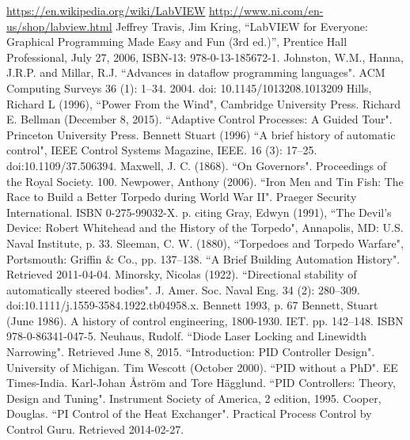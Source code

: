 
\begin{thebibliography}{99}

 \url{https://en.wikipedia.org/wiki/LabVIEW}
 \url{http://www.ni.com/en-us/shop/labview.html}
 Jeffrey Travis, Jim Kring, “LabVIEW for Everyone: Graphical Programming Made Easy and Fun (3rd ed.)”, Prentice Hall Professional, July 27, 2006, ISBN-13: 978-0-13-185672-1.
 Johnston, W.M., Hanna, J.R.P. and Millar, R.J. ``Advances in dataflow programming languages". ACM Computing Surveys 36 (1): 1–34. 2004. doi: 10.1145/1013208.1013209
 Hills, Richard L (1996), ``Power From the Wind", Cambridge University Press.
 Richard E. Bellman (December 8, 2015). ``Adaptive Control Processes: A Guided Tour". Princeton University Press.
 Bennett Stuart (1996) ``A brief history of automatic control", IEEE Control Systems Magazine, IEEE. 16 (3): 17–25. doi:10.1109/37.506394.
 Maxwell, J. C. (1868). ``On Governors". Proceedings of the Royal Society. 100.
 Newpower, Anthony (2006). ``Iron Men and Tin Fish: The Race to Build a Better Torpedo during World War II". Praeger Security International. ISBN 0-275-99032-X. p.  citing Gray, Edwyn (1991), ``The Devil's Device: Robert Whitehead and the History of the Torpedo", Annapolis, MD: U.S. Naval Institute, p. 33.
 Sleeman, C. W. (1880), ``Torpedoes and Torpedo Warfare", Portsmouth: Griffin \& Co., pp. 137–138.
 ``A Brief Building Automation History". Retrieved 2011-04-04.
 Minorsky, Nicolas (1922). ``Directional stability of automatically steered bodies". J. Amer. Soc. Naval Eng. 34 (2): 280–309. doi:10.1111/j.1559-3584.1922.tb04958.x.
 Bennett 1993, p. 67
 Bennett, Stuart (June 1986). A history of control engineering, 1800-1930. IET. pp. 142–148. ISBN 978-0-86341-047-5.
 Neuhaus, Rudolf. ``Diode Laser Locking and Linewidth Narrowing". Retrieved June 8, 2015.
 ``Introduction: PID Controller Design". University of Michigan.
 Tim Wescott (October 2000). ``PID without a PhD". EE Times-India.
 Karl-Johan Åström and Tore Hägglund. ``PID Controllers: Theory, Design and Tuning". Instrument Society of America, 2 edition, 1995.
 Cooper, Douglas. ``PI Control of the Heat Exchanger". Practical Process Control by Control Guru. Retrieved 2014-02-27.

\end{thebibliography}
